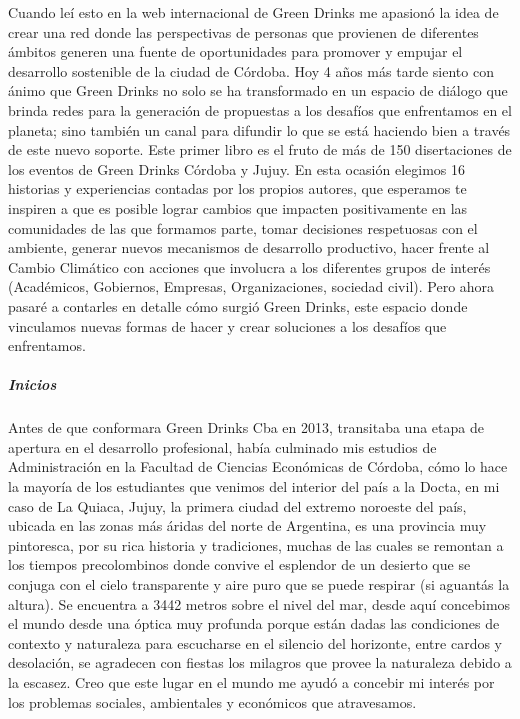 \documentclass[
]{article}
\begin{document}
Cuando leí esto en la web internacional de Green Drinks me apasionó la
idea de crear una red donde las perspectivas de personas que provienen
de diferentes ámbitos generen una fuente de oportunidades para promover
y empujar el desarrollo sostenible de la ciudad de Córdoba. Hoy 4 años
más tarde siento con ánimo que Green Drinks no solo se ha transformado
en un espacio de diálogo que brinda redes para la generación de
propuestas a los desafíos que enfrentamos en el planeta; sino también un
canal para difundir lo que se está haciendo bien a través de este nuevo
soporte. Este primer libro es el fruto de más de 150 disertaciones de
los eventos de Green Drinks Córdoba y Jujuy. En esta ocasión elegimos 16
historias y experiencias contadas por los propios autores, que esperamos
te inspiren a que es posible lograr cambios que impacten positivamente
en las comunidades de las que formamos parte, tomar decisiones
respetuosas con el ambiente, generar nuevos mecanismos de desarrollo
productivo, hacer frente al Cambio Climático con acciones que involucra
a los diferentes grupos de interés (Académicos, Gobiernos, Empresas,
Organizaciones, sociedad civil). Pero ahora pasaré a contarles en
detalle cómo surgió Green Drinks, este espacio donde vinculamos nuevas
formas de hacer y crear soluciones a los desafíos que enfrentamos.

\hypertarget{inicios}{%
\subparagraph{Inicios}\label{inicios}}

Antes de que conformara Green Drinks Cba en 2013, transitaba una etapa
de apertura en el desarrollo profesional, había culminado mis estudios
de Administración en la Facultad de Ciencias Económicas de Córdoba, cómo
lo hace la mayoría de los estudiantes que venimos del interior del país
a la Docta, en mi caso de La Quiaca, Jujuy, la primera ciudad del
extremo noroeste del país, ubicada en las zonas más áridas del norte de
Argentina, es una provincia muy pintoresca, por su rica historia y
tradiciones, muchas de las cuales se remontan a los tiempos
precolombinos donde convive el esplendor de un desierto que se conjuga
con el cielo transparente y aire puro que se puede respirar (si aguantás
la altura). Se encuentra a 3442 metros sobre el nivel del mar, desde
aquí concebimos el mundo desde una óptica muy profunda porque están
dadas las condiciones de contexto y naturaleza para escucharse en el
silencio del horizonte, entre cardos y desolación, se agradecen con
fiestas los milagros que provee la naturaleza debido a la escasez. Creo
que este lugar en el mundo me ayudó a concebir mi interés por los
problemas sociales, ambientales y económicos que atravesamos.
\end{document}
